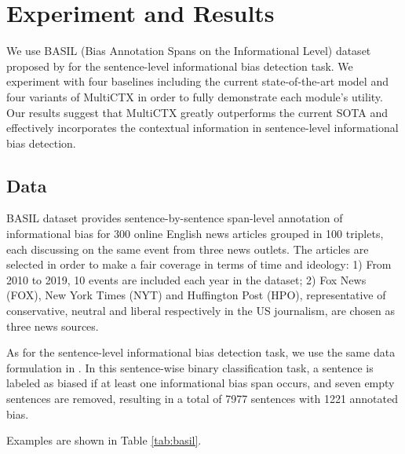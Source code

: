 \section{Experiment and Results}

We use BASIL (Bias Annotation Spans on the
 Informational Level) dataset proposed by \citet{fan-etal-2019-plain} for the sentence-level informational bias detection task.
We experiment with four baselines including the current state-of-the-art model and four variants of MultiCTX in order to fully demonstrate each module's utility. Our results suggest that MultiCTX greatly outperforms the current SOTA and effectively incorporates the contextual information in sentence-level informational bias detection.

\subsection{Data}

 BASIL dataset provides sentence-by-sentence span-level annotation of informational bias for 300 online English news articles grouped in 100 triplets, each discussing on the same event from three news outlets. The articles are selected in order to make a fair coverage in terms of time and ideology: 1) From 2010 to 2019, 10 events are included each year in the dataset; 2) Fox News (FOX), New York Times (NYT) and Huffington Post (HPO), representative of conservative, neutral and liberal respectively in the US journalism, are chosen as three news sources.

As for the sentence-level informational bias detection task, we use the same data formulation in \citet{van-den-berg-markert-2020-context}. In this sentence-wise binary classification task, a sentence is labeled as biased if at least one informational bias span occurs, and seven empty sentences are removed, resulting in a total of 7977 sentences with 1221 annotated bias.

Examples are shown in Table \ref{tab:basil}.


